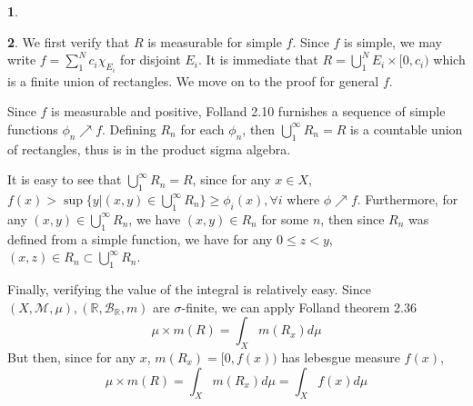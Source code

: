 \documentclass[10.5pt]{article}
\theoremstyle{definition}
\newtheorem{pb}{}
\newcommand{\set}[1]{\{#1\}}
\newcommand{\tand}{\text{ and }}
\begin{document}
\begin{pb}

    \end{pb}
    \begin{pb}
        We first verify that \(R\) is measurable for simple \(f\). Since \(f\) is simple, we may write \(f = \sum_1^N c_i \chi_{E_i}\) for disjoint \(E_i\). It is immediate that
        \(R = \bigcup_1^N E_i \times [0,c_i)\) which is a finite union of rectangles. We move on to the proof for general \(f\).

        Since \(f\) is measurable and positive, Folland 2.10 furnishes a sequence of simple functions \(\phi_n \nearrow f\). Defining \(R_n\) for each \(\phi_n\), then \(\bigcup_1^\infty R_n = R\)
        is a countable union of rectangles, thus is in the product sigma algebra. 
        
        It is easy to see that \(\bigcup_1^\infty R_n = R\), since for any \(x \in X\), 
        \(f(x) > \sup\set{y \vert (x,y) \in \bigcup_1^\infty R_n} \geq \phi_i(x), \forall i\) where \(\phi\nearrow f\). Furthermore, for any \((x,y) \in \bigcup_1^\infty R_n\), we have \((x,y) \in R_n\) for some \(n\), then since
        \(R_n\) was defined from a simple function, we have for any \(0 \leq z < y\), \((x,z) \in R_n \subset \bigcup_1^\infty R_n\).

        Finally, verifying the value of the integral is relatively easy. Since \((X,\mathcal{M},\mu), (\mathbb{R},\mathcal{B}_\mathbb{R},m)\) are \(\sigma\)-finite, we can apply Folland theorem 2.36
        \[\mu \times m(R) = \int_X m(R_x)d\mu\]
        But then, since for any \(x\), \(m(R_x) = [0,f(x))\) has lebesgue measure \(f(x)\),
        \[\mu \times m(R) = \int_X m(R_x)d\mu = \int_X f(x)d\mu\]
    \end{pb}
\end{document}
